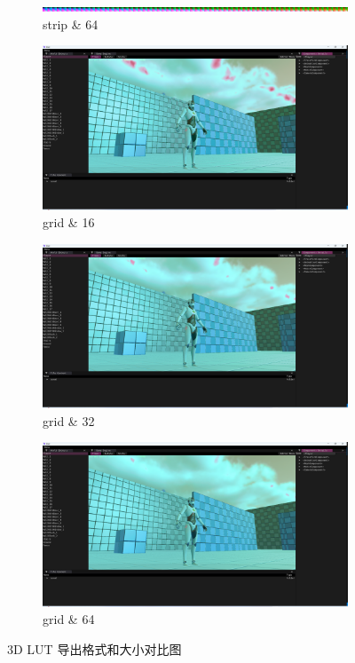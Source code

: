 \documentclass{ctexart}
\begin{document}
\begin{figure}[!htbp]
\begin{subfigure}{0.3\textwidth}
    		\includegraphics[width=\textwidth]{cube_strip_2d_64_avatar.png}
    		\caption{strip \& 64}
    	\end{subfigure}
    	\begin{subfigure}{0.3\textwidth}
    		\includegraphics[width=\textwidth]{screen_shot_cube_grid_2d_16_avatar.png}
    		\caption{grid \& 16}
    	\end{subfigure}
    	\begin{subfigure}{0.3\textwidth}
    		\includegraphics[width=\textwidth]{screen_shot_cube_grid_2d_32_avatar.png}
    		\caption{grid \& 32}
    	\end{subfigure}
    	\begin{subfigure}{0.3\textwidth}
    		\includegraphics[width=\textwidth]{screen_shot_cube_grid_2d_64_avatar.png}
    		\caption{grid \& 64}
    	\end{subfigure} 
    	\caption{3D LUT 导出格式和大小对比图}
    \end{figure}    
\end{document}
